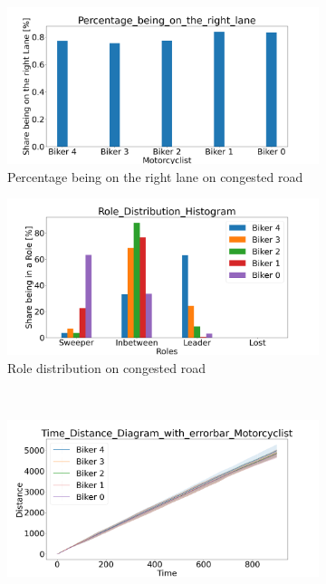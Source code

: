 \begin{figure}[H]
    \centering
    \begin{subfigure}[b]{0.45\textwidth}
        \centering
        \includegraphics[width=1.0\textwidth]{images/Kaltenbronner/Kaltenbronner_Percentage_being_on_the_right_lane_congested.png}
        \caption{Percentage being on the right lane on congested road}
    \end{subfigure}
    \hfill
    \begin{subfigure}[b]{0.45\textwidth}
        \centering
        \includegraphics[width=1.0\textwidth]{images/Kaltenbronner/Kaltenbronner_Role_Distribution_Histogram_congested.png}
        \caption{Role distribution on congested road}
    \end{subfigure}
    \\
    \begin{subfigure}[b]{0.45\textwidth}
        \centering
        \includegraphics[width=1.0\textwidth]{images/Kaltenbronner/Kaltenbronner_Time_Distance_Diagram_with_errorbar_congested.png}

\end{subfigure}
\end{figure}
